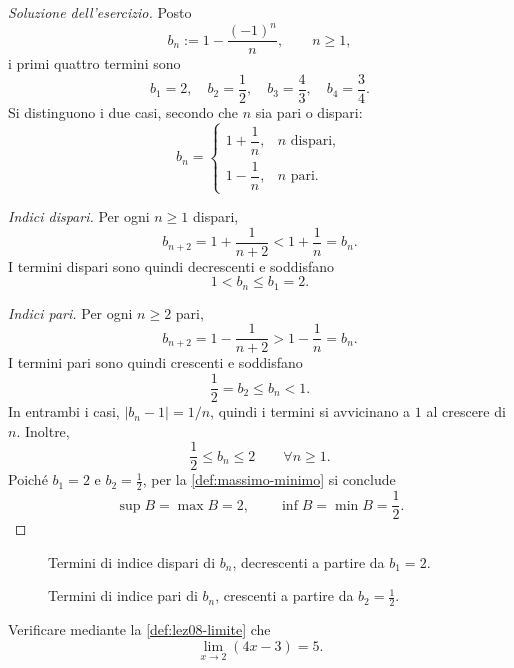 \begin{proof}[Soluzione dell'esercizio]
Posto
\[
  b_n:=1-\frac{(-1)^n}{n},\qquad n\ge1,
\]
i primi quattro termini sono
\[
  b_1=2,\quad b_2=\frac12,\quad
  b_3=\frac43,\quad b_4=\frac34.
\]
Si distinguono i due casi, secondo che \(n\) sia pari o dispari:
\[
  b_n=\begin{cases}
    1+\dfrac1n,&n\text{ dispari},\\[4pt]
    1-\dfrac1n,&n\text{ pari}.
  \end{cases}
\]

\emph{Indici dispari.}
Per ogni \(n\ge1\) dispari,
\[
  b_{n+2}=1+\frac1{n+2}<1+\frac1n=b_n.
\]
I termini dispari sono quindi decrescenti e soddisfano
\[
  1<b_n\le b_1=2.
\]

\emph{Indici pari.}
Per ogni \(n\ge2\) pari,
\[
  b_{n+2}=1-\frac1{n+2}>1-\frac1n=b_n.
\]
I termini pari sono quindi crescenti e soddisfano
\[
  \frac12=b_2\le b_n<1.
\]
In entrambi i casi, \(\lvert b_n-1\rvert=1/n\), quindi i termini si
avvicinano a \(1\) al crescere di \(n\). Inoltre,
\[
  \frac12\le b_n\le2\qquad\forall n\ge1.
\]
Poiché \(b_1=2\) e \(b_2=\frac12\), per la
\cref{def:massimo-minimo} si conclude
\[
  \sup B=\max B=2,\qquad
  \inf B=\min B=\frac12.
\]
\end{proof}

\begin{figure}[htbp]
  \centering
  
  \caption{Termini di indice dispari di \(b_n\), decrescenti
  a partire da \(b_1=2\).}
  \label{fig:termini-dispari}
\end{figure}

\begin{figure}[htbp]
  \centering
  
  \caption{Termini di indice pari di \(b_n\), crescenti
  a partire da \(b_2=\frac12\).}
  \label{fig:termini-pari}
\end{figure}

\clearpage

\begin{exercise}
\label{ex:limite-lineare}
Verificare mediante la \cref{def:lez08-limite} che
\[
  \lim_{x\to2}(4x-3)=5.
\]
\end{exercise}

